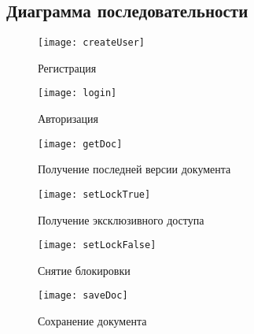 \subsection{Диаграмма последовательности}
\begin{figure}[H]
	\centering
	\texttt{[image: createUser]}
	\caption{Регистрация}
	\label{fig:reg}
\end{figure}

\begin{figure}[H]
	\centering
	\texttt{[image: login]}
	\caption{Авторизация}
	\label{fig:login}
\end{figure}

\begin{figure}[H]
\centering
\texttt{[image: getDoc]}
\caption{Получение последней версии документа}
\label{fig:getdoc}
\end{figure}

\begin{figure}[H]
	\centering
	\texttt{[image: setLockTrue]}
	\caption{Получение эксклюзивного доступа}
	\label{fig:lock}
\end{figure}

\begin{figure}[H]
	\centering
	\texttt{[image: setLockFalse]}
	\caption{Снятие блокировки}
	\label{fig:unlock}
\end{figure}

\begin{figure}[H]
	\centering
	\texttt{[image: saveDoc]}
	\caption{Сохранение документа}
	\label{fig:save}
\end{figure}